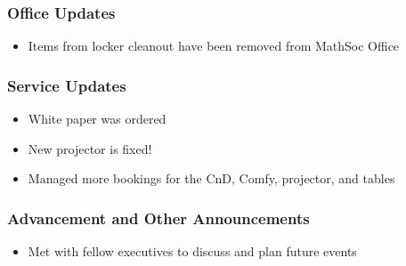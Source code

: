\subsubsection*{Office Updates}
\begin{itemize}
	\item Items from locker cleanout have been removed from MathSoc Office
\end{itemize}

\subsubsection*{Service Updates}
\begin{itemize}
	\item White paper was ordered
	\item New projector is fixed!
	\item Managed more bookings for the CnD, Comfy, projector, and tables
\end{itemize}

\subsubsection*{Advancement and Other Announcements}
\begin{itemize}
	\item Met with fellow executives to discuss and plan future events
\end{itemize}